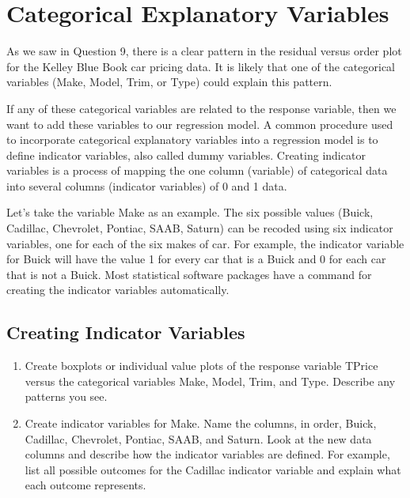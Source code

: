 \documentclass[
]{report}
\theoremstyle{definition}
\theoremstyle{definition}
\theoremstyle{definition}
\theoremstyle{definition}
\theoremstyle{remark}
\begin{document}
\hypertarget{categorical-explanatory-variables}{%
\section{Categorical Explanatory Variables}\label{categorical-explanatory-variables}}

As we saw in Question 9, there is a clear pattern in the residual versus order plot for the Kelley Blue Book car pricing data. It is likely that one of the categorical variables (Make, Model, Trim, or Type) could explain this pattern.

If any of these categorical variables are related to the response variable, then we want to add these variables to our regression model. A common procedure used to incorporate categorical explanatory variables into a regression model is to define indicator variables, also called dummy variables. Creating indicator variables is a process of mapping the one column (variable) of categorical data into several columns (indicator variables) of 0 and 1 data.

Let's take the variable Make as an example. The six possible values (Buick, Cadillac, Chevrolet, Pontiac, SAAB, Saturn) can be recoded using six indicator variables, one for each of the six makes of car. For example, the indicator variable for Buick will have the value 1 for every car that is a Buick and 0 for each car that is not a Buick. Most statistical software packages have a command for creating the indicator variables automatically.

\hypertarget{creating-indicator-variables}{%
\subsection*{Creating Indicator Variables}\label{creating-indicator-variables}}

\begin{enumerate}
\def\labelenumi{\arabic{enumi}.}
\setcounter{enumi}{16}
\item
  Create boxplots or individual value plots of the response variable TPrice versus the categorical variables Make, Model, Trim, and Type. Describe any patterns you see.
\item
  Create indicator variables for Make. Name the columns, in order, Buick, Cadillac, Chevrolet, Pontiac, SAAB, and Saturn. Look at the new data columns and describe how the indicator variables are defined. For example, list all possible outcomes for the Cadillac indicator variable and explain what each outcome
  represents.
\end{enumerate}
\end{document}
